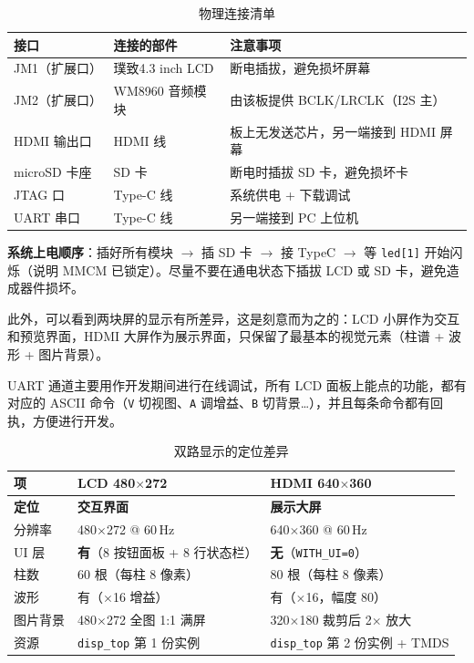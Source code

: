 \documentclass[withoutpreface,bwprint]{cumcmthesis}
\begin{document}
\begin{table}[H]
\centering
\caption{物理连接清单}
\label{tab:conn}
\begin{tabular}{p{2.4cm}p{3.4cm}p{6cm}}
\toprule[1.5pt]
\rowcolor{gray!25} 接口 & 连接的部件 & 注意事项 \\
\midrule[1pt]
JM1（扩展口）     & 璞致4.3 inch LCD & 断电插拔，避免损坏屏幕 \\
JM2（扩展口）     & WM8960 音频模块 & 由该板提供 BCLK/LRCLK（I2S 主）\\
HDMI 输出口       & HDMI 线 & 板上无发送芯片，另一端接到 HDMI 屏幕 \\
microSD 卡座      & SD 卡 & 断电时插拔 SD 卡，避免损坏卡 \\
JTAG 口           & Type-C 线 & 系统供电 + 下载调试 \\
UART 串口         & Type-C 线 & 另一端接到 PC 上位机 \\
\bottomrule[1.5pt]
\end{tabular}
\end{table}

\textbf{系统上电顺序}：插好所有模块 $\rightarrow$ 插 SD 卡 $\rightarrow$ 接 TypeC $\rightarrow$ 等 \texttt{led[1]} 开始闪烁（说明 MMCM 已锁定）。尽量不要在通电状态下插拔 LCD 或 SD 卡，避免造成器件损坏。

此外，可以看到两块屏的显示有所差异，这是刻意而为之的：LCD 小屏作为交互和预览界面，HDMI 大屏作为展示界面，只保留了最基本的视觉元素（柱谱 + 波形 + 图片背景）。

UART 通道主要用作开发期间进行在线调试，所有 LCD 面板上能点的功能，都有对应的 ASCII 命令（\texttt{V} 切视图、\texttt{A} 调增益、\texttt{B} 切背景…），并且每条命令都有回执，方便进行开发。

\begin{table}[H]
\centering
\caption{双路显示的定位差异}
\label{tab:dual}
\begin{tabular}{p{2.4cm}p{4.6cm}p{4.6cm}}
\toprule[1.5pt]
\rowcolor{gray!25} 项 & LCD 480$\times$272 & HDMI 640$\times$360 \\
\midrule[1pt]
\textbf{定位} & \textbf{交互界面} & \textbf{展示大屏} \\
分辨率 & 480$\times$272 @ 60\,Hz & 640$\times$360 @ 60\,Hz \\
UI 层 & \textbf{有}（8 按钮面板 + 8 行状态栏）& \textbf{无}（\texttt{WITH\_UI=0}）\\
柱数 & 60 根（每柱 8 像素）& 80 根（每柱 8 像素）\\
波形 & 有（$\times$16 增益）& 有（$\times$16，幅度 80）\\
图片背景 & 480$\times$272 全图 1:1 满屏 & 320$\times$180 裁剪后 2$\times$ 放大 \\
资源 & \texttt{disp\_top} 第 1 份实例 & \texttt{disp\_top} 第 2 份实例 + TMDS \\
\bottomrule[1.5pt]
\end{tabular}
\end{table}
\end{document}
